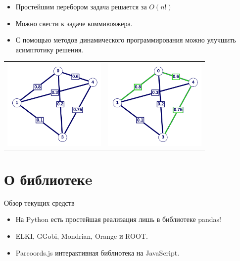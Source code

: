 \documentclass[fleqn, xcolor=x11names]{beamer}
\begin{document}
\begin{frame}{}

    \begin{itemize}
        \item Простейшим перебором задача решается за $O(n!)$
        \item Можно свести к задаче коммивояжера.
        \item С помощью методов динамического программирования можно улучшить асимптотику решения.
    \end{itemize}

    \vspace{10px}

    \begin{tabular}{cc}
        \centering
        \includegraphics[width=5cm]{graph_example_1.png} &
        \includegraphics[width=5cm]{graph_example_2.png}   \\
    \end{tabular}
\end{frame}

\section{О библиотекe}

\begin{frame}{Обзор текущих средств}

    \begin{itemize}
        \item На Python есть простейшая реализация лишь в библиотеке pandas!
        \item ELKI, GGobi, Mondrian, Orange и ROOT.
        \item Parcoords.js интерактивная библиотека на JavaScript.
    \end{itemize}

\end{frame}
\end{document}
